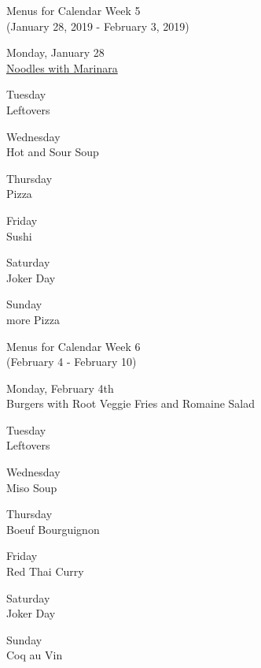 \documentclass[12pt, parskip=full*]{scrreprt}
\begin{document}
\begin{center}
{\Large Menus for Calendar Week 5} \\
{\small (January 28, 2019 - February 3, 2019)}

{\calligra \Large Monday, January 28} \\
\href{https://example.com/noodles.html}{Noodles with Marinara}

{\calligra \Large Tuesday} \\
Leftovers

{\calligra \Large Wednesday} \\
Hot and Sour Soup

{\calligra \Large Thursday} \\
Pizza

{\calligra \Large Friday} \\
Sushi

{\calligra \Large Saturday} \\
Joker Day

{\calligra \Large Sunday} \\
more Pizza
\newpage

{\Large Menus for Calendar Week 6} \\ 
{\small (February 4 - February 10)}

{\calligra \Large Monday, February 4th} \\
Burgers with Root Veggie Fries and Romaine Salad

{\calligra \Large Tuesday} \\
Leftovers

{\calligra \Large Wednesday} \\
Miso Soup

{\calligra \Large Thursday} \\
Boeuf Bourguignon

{\calligra \Large Friday} \\
Red Thai Curry

{\calligra \Large Saturday} \\
Joker Day

{\calligra \Large Sunday} \\
Coq au Vin

\end{center}
\end{document}
